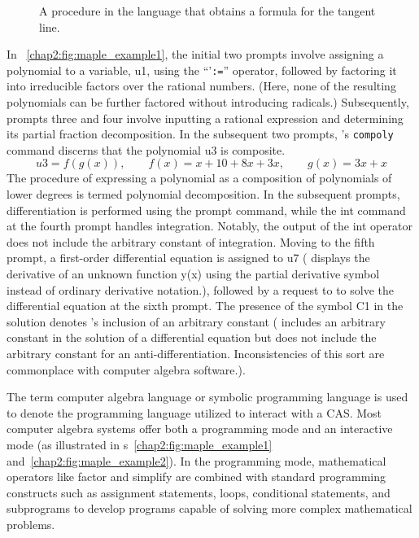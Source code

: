 \begin{figure}
  \centering
  \caption{A procedure in the \Maple{} language that obtains a formula for the tangent line.}
  \label{chap2:fig:maple_example3}
\end{figure}

In \figurename~\ref{chap2:fig:maple_example1}, the initial two prompts involve assigning a polynomial to a variable, u1, using the ``'\texttt{:=}'' operator, followed by factoring it into irreducible factors over the rational numbers. (Here, none of the resulting polynomials can be further factored without introducing radicals.) Subsequently, prompts three and four involve inputting a rational expression and determining its partial fraction decomposition. In the subsequent two prompts, \Maple{}'s \texttt{compoly} command discerns that the polynomial u3 is composite.
%
\begin{equation*}
  u3 = f(g(x)), \qquad f(x) = x + 10 + 8x + 3x, \qquad g(x) = 3x + x
\end{equation*}
%
The procedure of expressing a polynomial as a composition of polynomials of lower degrees is termed polynomial decomposition. In the subsequent prompts, differentiation is performed using the prompt command, while the int command at the fourth prompt handles integration. Notably, the output of the int operator does not include the arbitrary constant of integration. Moving to the fifth prompt, a first-order differential equation is assigned to u7 (\Maple{} displays the derivative of an unknown function y(x) using the partial derivative symbol instead of ordinary derivative notation.), followed by a request to \Maple{} to solve the differential equation at the sixth prompt. The presence of the symbol C1 in the solution denotes \Maple{}'s inclusion of an arbitrary constant (\Maple{} includes an arbitrary constant in the solution of a differential equation but does not include the arbitrary constant for an anti-differentiation. Inconsistencies of this sort are commonplace with computer algebra software.).

The term computer algebra language or symbolic programming language is used to denote the programming language utilized to interact with a \ac{CAS}. Most computer algebra systems offer both a programming mode and an interactive mode (as illustrated in \figurename{}s~\ref{chap2:fig:maple_example1} and~\ref{chap2:fig:maple_example2}). In the programming mode, mathematical operators like factor and simplify are combined with standard programming constructs such as assignment statements, loops, conditional statements, and subprograms to develop programs capable of solving more complex mathematical problems.

